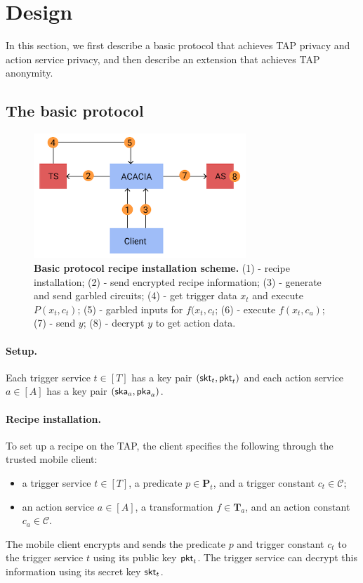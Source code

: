 \section{Design}
\label{sec:design}


In this section, we first describe a basic protocol that achieves TAP privacy
and action service privacy, and then describe an extension that achieves TAP
anonymity.

\subsection{The basic protocol}

\begin{figure}
\includegraphics[width=8cm]{graphics/ACACIA.png}
\caption{\textbf{Basic protocol recipe installation scheme.} (1) - recipe installation; (2) - send encrypted
recipe information; (3) - generate and send garbled circuits; (4) - get trigger data $x_t$ and execute 
$P(x_t, c_t)$; (5) - garbled inputs for $f(x_t, c_t$; (6) - execute $f(x_t, c_a)$; (7) - send $y$; (8) - decrypt
$y$ to get action data.}
\end{figure}

\paragraph{Setup.}
Each trigger service $t \in [T]$ has a key pair $(\mathsf{skt}_t, \mathsf{pkt}_t)$ and each
action service $a \in [A]$ has a key pair $(\mathsf{ska}_a, \mathsf{pka}_a)$.

\paragraph{Recipe installation.}
To set up a recipe on the TAP, the client specifies the following through the
trusted mobile client:
\begin{itemize}
  \item a trigger service $t \in [T]$, a predicate $p \in \mathbf{P}_t$, and a
    trigger constant $c_t \in \mathcal{C}$;
  \item an action service $a \in [A]$, a transformation $f \in \mathbf{T}_a$,
    and an action constant $c_a \in \mathcal{C}$.
\end{itemize}
The mobile client encrypts and sends the predicate $p$ and trigger constant
$c_t$ to the trigger service $t$ using its public key $\mathsf{pkt}_t$. The trigger
service can decrypt this information using its secret key $\mathsf{skt}_t$.

